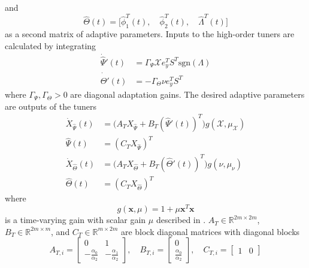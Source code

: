 \documentclass[english]{ifacconf}
\begin{document}
and 
\begin{equation}
\hat{\Theta}(t) = \big[ \hat{\phi}_1^T(t),\quad \hat{\phi}_2^T(t),\quad \hat{\Lambda}^T(t) \big]
\end{equation}
as a second matrix of adaptive parameters. Inputs to the high-order tuners are calculated by integrating
\begin{equation}
\begin{aligned}
\dot{\hat{\Psi}}'(t) &= \Gamma_{\Psi} \mathcal{X} e_y^T S^T \text{sgn}(\Lambda) \\
\dot{\hat{\Theta}}'(t) &= -\Gamma_{\Theta} \nu e_y^T S^T
\end{aligned}
\end{equation}
where $\Gamma_{\Psi}, \Gamma_{\Theta} > 0$ are diagonal adaptation gains. The desired adaptive parameters are outputs of the tuners
\begin{equation}
\begin{aligned}
	\dot{X}_{\hat{\Psi}}(t) &= \big( A_T X_{\hat{\Psi}} + B_T (\hat{\Psi}'(t))^T \big) g(\mathcal{X}, \mu_{\mathcal{X}}) \\
	\hat{\Psi}(t) &= (C_T X_{\hat{\Psi}})^T \\
	\dot{X}_{\hat{\Theta}}(t) &= \big( A_T X_{\hat{\Theta}} + B_T (\hat{\Theta}'(t))^T \big) g(\nu, \mu_{\nu}) \\
	\hat{\Theta}(t) &= (C_T X_{\hat{\Theta}})^T
\end{aligned}	
\end{equation}
where
\begin{equation}
g(\mathbf{x}, \mu) = 1 + \mu \mathbf{x}^T \mathbf{x}	
\end{equation}
is a time-varying gain with scalar gain $\mu$ described in \cite{qu2016phd}. $A_T \in \mathbb{R}^{2m \times 2m}$, $B_T \in \mathbb{R}^{2m \times m}$, and $C_T \in \mathbb{R}^{m \times 2m}$ are block diagonal matrices with diagonal blocks
\begin{equation}
A_{T,i} = \begin{bmatrix}
	0 & 1\\ -\frac{\alpha_0}{\alpha_2} & -\frac{\alpha_1}{\alpha_2}
\end{bmatrix}, \quad B_{T,i} = \begin{bmatrix}
	0 \\ \frac{\alpha_0}{\alpha_2}
\end{bmatrix}, \quad C_{T,i} = \begin{bmatrix}
	1 & 0
\end{bmatrix}
\end{equation}
\end{document}
